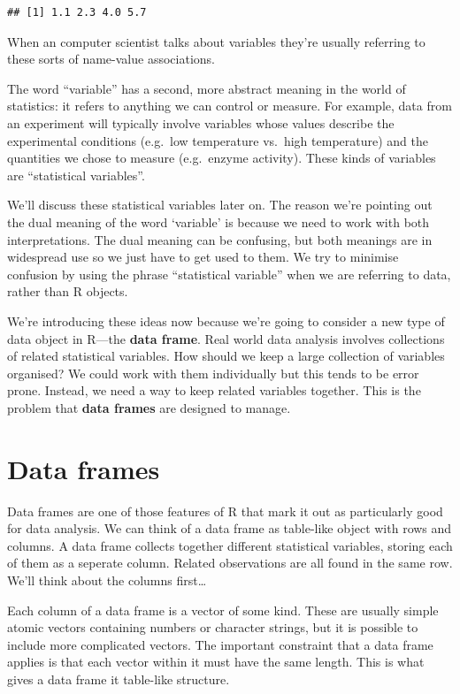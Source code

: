 \documentclass[
]{book}
\begin{document}
\begin{verbatim}
## [1] 1.1 2.3 4.0 5.7
\end{verbatim}

When an computer scientist talks about variables they're usually referring to these sorts of name-value associations.

The word ``variable'' has a second, more abstract meaning in the world of statistics: it refers to anything we can control or measure. For example, data from an experiment will typically involve variables whose values describe the experimental conditions (e.g.~low temperature vs.~high temperature) and the quantities we chose to measure (e.g.~enzyme activity). These kinds of variables are ``statistical variables''.

We'll discuss these statistical variables later on. The reason we're pointing out the dual meaning of the word `variable' is because we need to work with both interpretations. The dual meaning can be confusing, but both meanings are in widespread use so we just have to get used to them. We try to minimise confusion by using the phrase ``statistical variable'' when we are referring to data, rather than R objects.

We're introducing these ideas now because we're going to consider a new type of data object in R---the \textbf{data frame}. Real world data analysis involves collections of related statistical variables. How should we keep a large collection of variables organised? We could work with them individually but this tends to be error prone. Instead, we need a way to keep related variables together. This is the problem that \textbf{data frames} are designed to manage.

\hypertarget{data-frames-intro}{%
\section{Data frames}\label{data-frames-intro}}

Data frames are one of those features of R that mark it out as particularly good for data analysis. We can think of a data frame as table-like object with rows and columns. A data frame collects together different statistical variables, storing each of them as a seperate column. Related observations are all found in the same row. We'll think about the columns first\ldots{}

Each column of a data frame is a vector of some kind. These are usually simple atomic vectors containing numbers or character strings, but it is possible to include more complicated vectors. The important constraint that a data frame applies is that each vector within it must have the same length. This is what gives a data frame it table-like structure.
\end{document}
